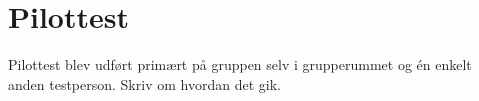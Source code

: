 \chapter{Pilottest}
\label{ParametrePilottest}
%
Pilottest blev udført primært på gruppen selv i grupperummet og én enkelt anden testperson. Skriv om hvordan det gik. 